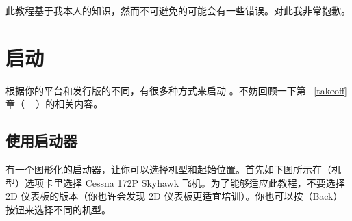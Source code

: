 \ifchinese
此教程基于我本人的知识，然而不可避免的可能会有一些错误。对此我非常抱歉。
\fi

{}

\ifchinese
\section{启动}
\fi

{}
\ifchinese
根据你的平台和发行版的不同，有很多种方式来启动 \FlightGear{}。不妨回顾一下第 ~\ref{takeoff} 章（ ~ ）的相关内容。
\fi

\newpage
\subsection{使用启动器}
\ifchinese
\FlightGear{} 有一个图形化的启动器，让你可以选择机型和起始位置。首先如下图所示在（机型）选项卡里选择 Cessna 172P Skyhawk 飞机。为了能够适应此教程，不要选择 2D 仪表板的版本（你也许会发现 2D 仪表板更适宜培训）。你也可以按（Back）按钮来选择不同的机型。
\fi

{}

